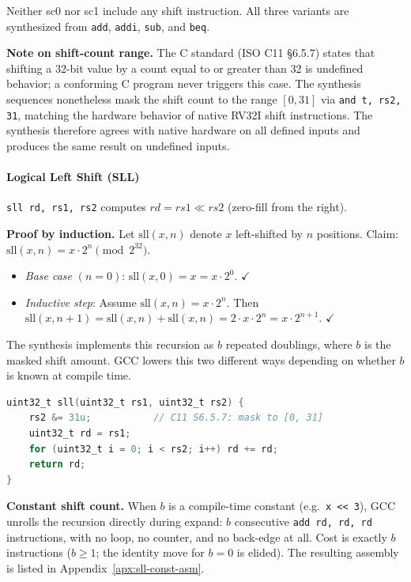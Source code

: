 Neither sc0 nor sc1 include any shift instruction. All three variants are synthesized from
\texttt{add}, \texttt{addi}, \texttt{sub}, and \texttt{beq}.

\textbf{Note on shift-count range.} The C standard (ISO C11 \S6.5.7) states that shifting a 32-bit
value by a count equal to or greater than 32 is undefined behavior; a conforming C program never
triggers this case. The synthesis sequences nonetheless mask the shift count to the range $[0, 31]$
via \texttt{and t, rs2, 31}, matching the hardware behavior of native RV32I shift instructions. The
synthesis therefore agrees with native hardware on all defined inputs and produces the same result on
undefined inputs.

\paragraph{Logical Left Shift (SLL)} \label{sec:sc1-sll}

\texttt{sll rd, rs1, rs2} computes $\mathit{rd} = \mathit{rs1} \ll \mathit{rs2}$ (zero-fill from
the right).

\textbf{Proof by induction.} Let $\text{sll}(x, n)$ denote $x$ left-shifted by $n$ positions. Claim:
$\text{sll}(x, n) = x \cdot 2^n \pmod{2^{32}}$.

\begin{itemize}
  \item \textit{Base case} $(n = 0)$: $\text{sll}(x, 0) = x = x \cdot 2^0$. $\checkmark$
  \item \textit{Inductive step}: Assume $\text{sll}(x, n) = x \cdot 2^n$. Then
        $\text{sll}(x, n+1) = \text{sll}(x, n) + \text{sll}(x, n) = 2 \cdot x \cdot 2^n =
        x \cdot 2^{n+1}$. $\checkmark$
\end{itemize}

The synthesis implements this recursion as $b$ repeated doublings, where $b$ is the masked shift
amount. GCC lowers this two different ways depending on whether $b$ is known at compile time.


\begin{lstlisting}[language=C]
uint32_t sll(uint32_t rs1, uint32_t rs2) {
    rs2 &= 31u;           // C11 S6.5.7: mask to [0, 31]
    uint32_t rd = rs1;
    for (uint32_t i = 0; i < rs2; i++) rd += rd;
    return rd;
}
\end{lstlisting}

\textbf{Constant shift count.} When $b$ is a compile-time constant (e.g.\ \texttt{x << 3}), GCC
unrolls the recursion directly during expand: $b$ consecutive \texttt{add rd, rd, rd} instructions,
with no loop, no counter, and no back-edge at all. Cost is exactly $b$ instructions ($b \geq 1$; the
identity move for $b = 0$ is elided). The resulting assembly is listed in
Appendix~\ref{apx:sll-const-asm}.

